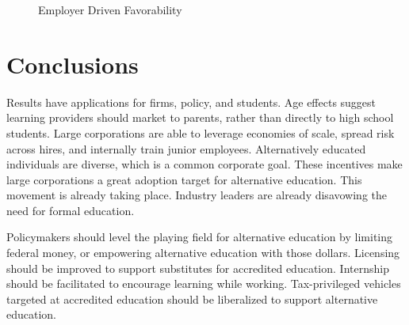 \documentclass[review]{elsarticle}
\begin{document}
        \begin{figure}[h!]
            \centering
            \caption{Employer Driven Favorability}
        

            \label{fig:employer_driven_favorability}
            \end{figure}

        \section{Conclusions}
        
        Results have applications for firms, policy, and students.
        Age effects suggest learning providers should market to parents,
        rather than directly to high school students.
        Large corporations are able to leverage economies of scale, spread risk across hires,
        and internally train junior employees.
        Alternatively educated individuals are diverse\cite{florentine_2018}, which is a common corporate goal.
        These incentives make large corporations a great adoption target for alternative education.
        This movement is already taking place. Industry leaders are already disavowing the need for formal education\cite{glassdoor_2018}.

        Policymakers should level the playing field for alternative education by limiting federal money,
        or empowering alternative education with those dollars.
        Licensing should be improved to support substitutes for accredited education.
        Internship should be facilitated to encourage learning while working.
        Tax-privileged vehicles targeted at accredited education should be liberalized
        to support alternative education.
\end{document}
